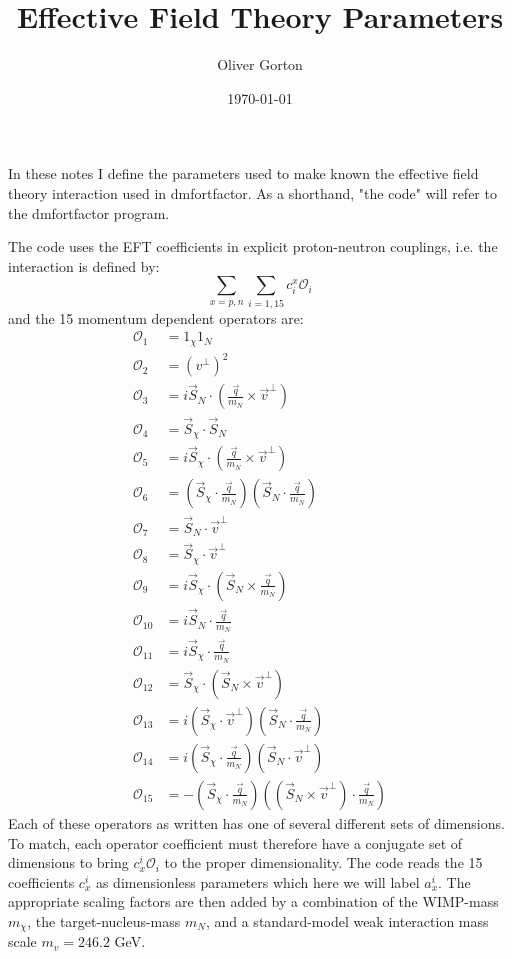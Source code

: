 \documentclass{article}
\title{Effective Field Theory Parameters}
\author{Oliver Gorton}
\date{\today}
\begin{document}
\maketitle

In these notes I define the parameters used to make known the effective field
theory interaction used in dmfortfactor. As a shorthand, "the code" will refer to
the dmfortfactor program.

The code uses the EFT coefficients in explicit proton-neutron couplings, i.e.
the interaction is defined by:
\begin{equation}
    \sum_{x=p,n}\sum_{i=1,15} c^x_i \mathcal{O} _i
\end{equation}
and the 15 momentum dependent operators are:
\begin{align}
    \mathcal{O} _1 &= 1_\chi 1_N\\
    \mathcal{O} _2 &= (v^\perp)^2\\
    \mathcal{O} _3 &= i\vec{S}_N \cdot \left(\frac{\vec{q}}{m_N}\times
        \vec{v}^\perp\right)\\
    \mathcal{O} _4 &= \vec{S}_\chi \cdot \vec{S}_N\\
    \mathcal{O} _5 &= i\vec{S}_\chi \cdot \left(\frac{\vec{q}}{m_N}\times
        \vec{v}^\perp\right)\\
    \mathcal{O} _6 &= \left(\vec{S}_\chi \cdot \frac{\vec{q}}{m_N} \right)
        \left(\vec{S}_N \cdot \frac{\vec{q}}{m_N} \right) \\
    \mathcal{O} _7 &= \vec{S}_N\cdot \vec{v}^\perp \\
    \mathcal{O} _8 &= \vec{S}_\chi\cdot \vec{v}^\perp \\
    \mathcal{O} _9 &= i\vec{S}_\chi \cdot \left(\vec{S}_N \times
        \frac{\vec{q}}{m_N}\right)\\
    \mathcal{O} _{10} &= i\vec{S}_N \cdot \frac{\vec{q}}{m_N}\\
    \mathcal{O} _{11} &= i\vec{S}_\chi \cdot \frac{\vec{q}}{m_N}\\
    \mathcal{O} _{12} &= \vec{S}_\chi \cdot \left( \vec{S}_N\times 
        \vec{v}^\perp\right)\\
    \mathcal{O} _{13} &= i\left( \vec{S}_\chi \cdot \vec{v}^\perp \right) 
        \left(\vec{S}_N\cdot \frac{\vec{q}}{m_N}\right )\\
    \mathcal{O} _{14} &= i\left( \vec{S}_\chi \cdot \frac{\vec{q}}{m_N} \right) 
        \left(\vec{S}_N\cdot \vec{v}^\perp \right )\\
    \mathcal{O} _{15} &= -\left(\vec{S}_\chi \cdot \frac{\vec{q}}{m_N} \right )
        \left( \left( \vec{S}_N\times \vec{v}^\perp\right)\cdot 
        \frac{\vec{q}}{m_N} \right)
\end{align}
Each of these operators as written has one of several different sets of
dimensions. To match, each operator coefficient must therefore have a conjugate
set of dimensions to bring $c_x^i \mathcal{O}_i$ to the proper dimensionality. 
The code reads the 15 coefficients $c_x^i$ as dimensionless parameters which
here we will label $a_x^i$. The appropriate scaling factors are then added by a
combination of the WIMP-mass $m_\chi$, the target-nucleus-mass $m_N$, and a
standard-model weak interaction mass scale $m_v=246.2$ GeV.
\end{document}
